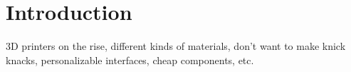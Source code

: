 \section{Introduction}
3D printers on the rise, different kinds of materials, don't want to make knick knacks, personalizable interfaces, cheap components, etc.